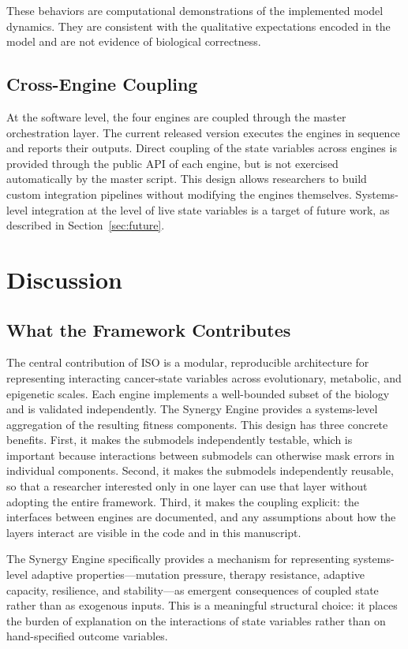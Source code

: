 \documentclass[12pt,a4paper]{article}
\begin{document}
These behaviors are computational demonstrations of the implemented model dynamics. They are consistent with the qualitative expectations encoded in the model and are not evidence of biological correctness.

\subsection{Cross-Engine Coupling}

At the software level, the four engines are coupled through the master orchestration layer. The current released version executes the engines in sequence and reports their outputs. Direct coupling of the state variables across engines is provided through the public API of each engine, but is not exercised automatically by the master script. This design allows researchers to build custom integration pipelines without modifying the engines themselves. Systems-level integration at the level of live state variables is a target of future work, as described in Section~\ref{sec:future}.

\section{Discussion}
\label{sec:discussion}

\subsection{What the Framework Contributes}

The central contribution of ISO is a modular, reproducible architecture for representing interacting cancer-state variables across evolutionary, metabolic, and epigenetic scales. Each engine implements a well-bounded subset of the biology and is validated independently. The Synergy Engine provides a systems-level aggregation of the resulting fitness components. This design has three concrete benefits. First, it makes the submodels independently testable, which is important because interactions between submodels can otherwise mask errors in individual components. Second, it makes the submodels independently reusable, so that a researcher interested only in one layer can use that layer without adopting the entire framework. Third, it makes the coupling explicit: the interfaces between engines are documented, and any assumptions about how the layers interact are visible in the code and in this manuscript.

The Synergy Engine specifically provides a mechanism for representing systems-level adaptive properties---mutation pressure, therapy resistance, adaptive capacity, resilience, and stability---as emergent consequences of coupled state rather than as exogenous inputs. This is a meaningful structural choice: it places the burden of explanation on the interactions of state variables rather than on hand-specified outcome variables.
\end{document}
